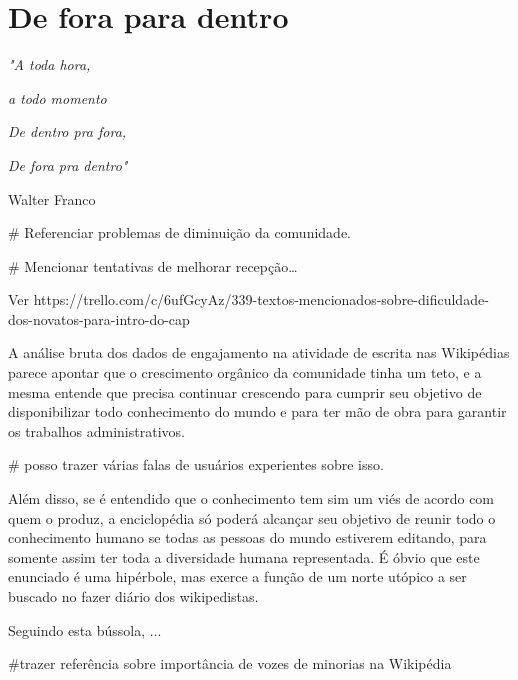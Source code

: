 \chapter{De fora para dentro}

\singlespacing
\begin{flushright}
\textit{"A toda hora,}

\textit{a todo momento}

\textit{De dentro pra fora,}

\textit{De fora pra dentro"}

Walter Franco
\end{flushright}
\doublespacing


# Referenciar problemas de diminuição da comunidade.


# Mencionar tentativas de melhorar recepção…

Ver https://trello.com/c/6ufGcyAz/339-textos-mencionados-sobre-dificuldade-dos-novatos-para-intro-do-cap%


A análise bruta dos dados de engajamento na atividade de escrita nas Wikipédias parece apontar que o crescimento orgânico da comunidade tinha um teto, e a mesma entende que precisa continuar crescendo para cumprir seu objetivo de disponibilizar todo conhecimento do mundo e para ter mão de obra para garantir os trabalhos administrativos.

# posso trazer várias falas de usuários experientes sobre isso.

Além disso, se é entendido que o conhecimento tem sim um viés de acordo com quem o produz, a enciclopédia só poderá alcançar seu objetivo de reunir todo o conhecimento humano se todas as pessoas do mundo estiverem editando, para somente assim ter toda a diversidade humana representada. É óbvio que este enunciado é uma hipérbole, mas exerce a função de um norte utópico a ser buscado no fazer diário dos wikipedistas.

Seguindo esta bússola, ...

#trazer referência sobre importância de vozes de minorias na Wikipédia







